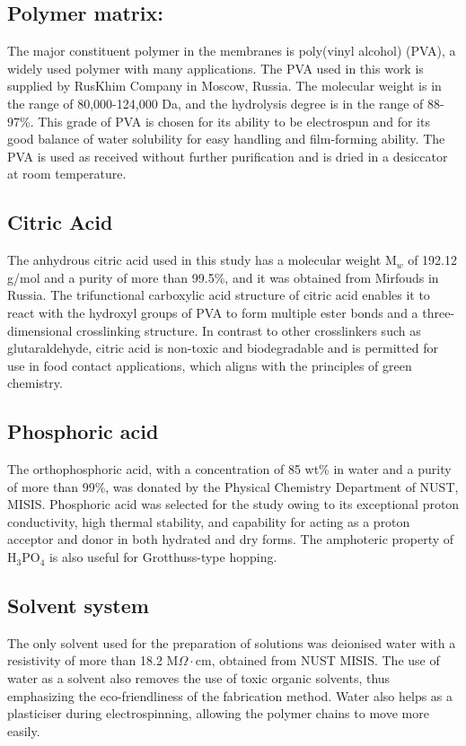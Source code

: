 \documentclass[12pt,a4paper]{report}
\begin{document}
\subsection{Polymer matrix:}
The major constituent polymer in the membranes is poly(vinyl alcohol) (PVA), a widely used polymer with many applications. The PVA used in this work is supplied by RusKhim Company in Moscow, Russia. The molecular weight is in the range of 80,000-124,000 Da, and the hydrolysis degree is in the range of 88-97\%. This grade of PVA is chosen for its ability to be electrospun and for its good balance of water solubility\cite{10,11} for easy handling and film-forming ability.\cite{44,45} The PVA is used as received without further purification and is dried in a desiccator at room temperature.

\subsection{Citric Acid}
The anhydrous citric acid used in this study has a molecular weight M\(_w\) of 192.12 g/mol and a purity of more than 99.5\%, and it was obtained from Mirfouds in Russia. The trifunctional carboxylic acid structure of citric acid enables it to react with the hydroxyl groups of PVA to form multiple ester bonds and a three-dimensional crosslinking structure.\cite{50,51} In contrast to other crosslinkers such as glutaraldehyde, citric acid is non-toxic and biodegradable and is permitted for use in food contact applications, which aligns with the principles of green chemistry.\cite{48, 53}

\subsection{Phosphoric acid}
The orthophosphoric acid, with a concentration of 85 wt\% in water and a purity of more than 99\%, was donated by the Physical Chemistry Department of NUST, MISIS. Phosphoric acid was selected for the study owing to its exceptional proton conductivity, high thermal stability, and capability for acting as a proton acceptor and donor in both hydrated and dry forms.\cite{55,56} The amphoteric property of H\(_3\)PO\(_4\) is also useful for Grotthuss-type hopping.\cite{21}

\subsection{Solvent system}
The only solvent used for the preparation of solutions was deionised water with a resistivity of more than 18.2 M\(\Omega\cdot\)cm, obtained from NUST MISIS. The use of water as a solvent also removes the use of toxic organic solvents, thus emphasizing the eco-friendliness of the fabrication method.\cite{54} Water also helps as a plasticiser during electrospinning, allowing the polymer chains to move more easily.\cite{46}
\end{document}
